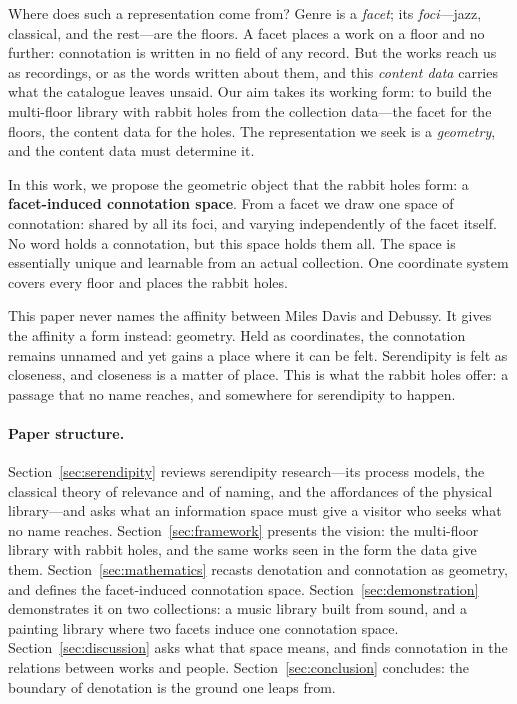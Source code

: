 Where does such a representation come from? Genre is a \emph{facet}; its
\emph{foci}---jazz, classical, and the rest---are the floors. A facet places a
work on a floor and no further: connotation is written in no field of any
record. But the works reach us as recordings, or as the words written about
them, and this \emph{content data} carries what the catalogue leaves unsaid.
Our aim takes its working form: to build the multi-floor library with rabbit
holes from the collection data---the facet for the floors, the content data
for the holes. The representation we seek is a \emph{geometry}, and the
content data must determine it.

In this work, we propose the geometric object that the rabbit holes form:
a \textbf{facet-induced connotation space}. From a facet we draw one space of
connotation: shared by all its foci, and varying independently of the facet
itself. No word holds a connotation, but this space holds them all. The space
is essentially unique and learnable from an actual collection. One coordinate
system covers every floor and places the rabbit holes.

This paper never names the affinity between Miles Davis and Debussy. It gives
the affinity a form instead: geometry. Held as coordinates, the connotation
remains unnamed and yet gains a place where it can be felt. Serendipity is
felt as closeness, and closeness is a matter of place. This is what the
rabbit holes offer: a passage that no name reaches, and somewhere for
serendipity to happen.

\paragraph{Paper structure.}
Section~\ref{sec:serendipity} reviews serendipity research---its process models,
the classical theory of relevance and of naming, and the affordances of the
physical library---and asks what an information space must give a visitor who
seeks what no name reaches. Section~\ref{sec:framework} presents the vision: the
multi-floor library with rabbit holes, and the same works seen in the form the
data give them. Section~\ref{sec:mathematics} recasts denotation and connotation
as geometry, and defines the facet-induced connotation space.
Section~\ref{sec:demonstration} demonstrates it on two collections: a music
library built from sound, and a painting library where two facets induce one
connotation space. Section~\ref{sec:discussion} asks what that space means,
and finds connotation in the relations between works and people.
Section~\ref{sec:conclusion} concludes: the boundary of denotation is the
ground one leaps from.
